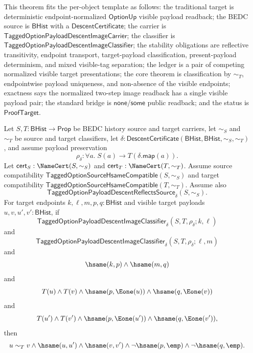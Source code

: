 \begin{theorem}
\label{thm:tagged-option-payload-descent-image-classifier-reflective-transitive-normalized-visible-payload-single-valuedness}
This theorem fits the per-object template as follows: the traditional target is
deterministic endpoint-normalized $\mathsf{OptionUp}$ visible payload readback;
the BEDC source is $\mathsf{BHist}$ with a $\mathsf{DescentCertificate}$; the
carrier is $\mathsf{TaggedOptionPayloadDescentImageCarrier}$; the classifier is
$\mathsf{TaggedOptionPayloadDescentImageClassifier}$; the stability obligations
are reflective transitivity, endpoint transport, target-payload classification,
present-payload determinism, and mixed visible-tag separation; the ledger is a
pair of competing normalized visible target presentations; the core theorem is
classification by $\sim_T$, endpointwise payload uniqueness, and non-absence of
the visible endpoints; exactness says the normalized two-step image readback has
a single visible payload pair; the standard bridge is
$\mathsf{none}$/$\mathsf{some}$ public readback; and the status is
$\mathsf{ProofTarget}$.

Let $S,T:\mathsf{BHist}\to\mathsf{Prop}$ be BEDC history source and target
carriers, let $\sim_S$ and $\sim_T$ be source and target classifiers, let
$\delta:\mathsf{DescentCertificate}(\mathsf{BHist},\mathsf{BHist},\sim_S,\sim_T)$,
and assume payload preservation
$$
\rho_{\delta}:\forall a.\;S(a)\to T(\delta.\mathsf{map}(a)).
$$
Let $\mathsf{cert}_S:\NameCert(S,\sim_S)$ and
$\mathsf{cert}_T:\NameCert(T,\sim_T)$. Assume source compatibility
$\mathsf{TaggedOptionSourceHsameCompatible}(S,\sim_S)$ and target compatibility
$\mathsf{TaggedOptionSourceHsameCompatible}(T,\sim_T)$. Assume also
$$
\mathsf{TaggedOptionPayloadDescentReflectsSource}_{\delta}(S,\sim_S).
$$
For target endpoints $k,\ell,m,p,q:\mathsf{BHist}$ and visible target payloads
$u,v,u',v':\mathsf{BHist}$, if
$$
\mathsf{TaggedOptionPayloadDescentImageClassifier}_{\delta}
(S,T,\rho_{\delta};k,\ell)
$$
and
$$
\mathsf{TaggedOptionPayloadDescentImageClassifier}_{\delta}
(S,T,\rho_{\delta};\ell,m)
$$
and
$$
\hsame(k,p)\land \hsame(m,q)
$$
and
$$
T(u)\land T(v)\land
\hsame(p,\Eone(u))\land
\hsame(q,\Eone(v))
$$
and
$$
T(u')\land T(v')\land
\hsame(p,\Eone(u'))\land
\hsame(q,\Eone(v')),
$$
then
$$
u\sim_T v\land
\hsame(u,u')\land
\hsame(v,v')\land
\neg\hsame(p,\emp)\land
\neg\hsame(q,\emp).
$$
\end{theorem}
